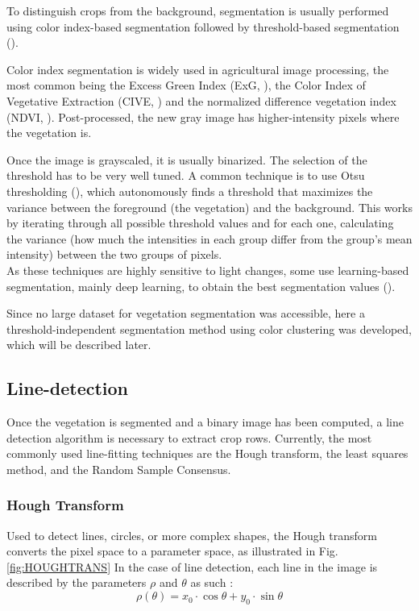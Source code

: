 To distinguish crops from the background, segmentation is usually performed using color index-based segmentation followed by threshold-based segmentation (\cite{VEGEIDX}). 

Color index segmentation is widely used in agricultural image processing, the most common being the Excess Green Index (ExG, \cite{ExgreenIdx}), the Color Index of Vegetative Extraction (CIVE, \cite{CIVE}) and the normalized difference vegetation index (NDVI, \cite{NDVI}). Post-processed, the new gray image has higher-intensity pixels where the vegetation is. 

Once the image is grayscaled, it is usually binarized. The selection of the threshold has to be very well tuned. 
A common technique is to use Otsu thresholding (\citet{4310076}), which autonomously finds a threshold that maximizes the variance between the foreground (the vegetation) and the background. This works by iterating through all possible threshold values and for each one, calculating the variance (how much the intensities in each group differ from the group's mean intensity) between the two groups of pixels. \\

As these techniques are highly sensitive to light changes, some use learning-based segmentation, mainly deep learning, to obtain the best segmentation values (\citet{deepLforSeg}). 

Since no large dataset for vegetation segmentation was accessible, here a threshold-independent segmentation method using color clustering was developed, which will be described later.

\subsection{Line-detection}

Once the vegetation is segmented and a binary image has been computed, a line detection algorithm is necessary to extract crop rows. Currently, the most commonly used line-fitting techniques are the Hough transform, the least squares method, and the Random Sample Consensus. 

\subsubsection{Hough Transform}
\label{subsubsection:HT}

Used to detect lines, circles, or more complex shapes, the Hough transform converts the pixel space to a parameter space, as illustrated in Fig. \ref{fig:HOUGHTRANS}
In the case of line detection, each line in the image is described by the parameters $\rho$  and $\theta$ as such : 
\begin{equation}
\rho(\theta) = x_{0} \cdot \cos{\theta} + y_{0} \cdot \sin{\theta} 
\end{equation}




